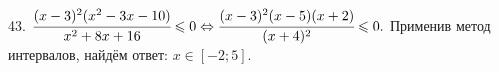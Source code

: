 43. $\cfrac{(x-3)^2(x^2-3x-10)}{x^2+8x+16}\leqslant0\Leftrightarrow\cfrac{(x-3)^2(x-5)(x+2)}{(x+4)^2}\leqslant0.$ Применив метод интервалов, найдём ответ: $x\in[-2;5].$
\begin{figure}[ht!]
\end{figure}\\
